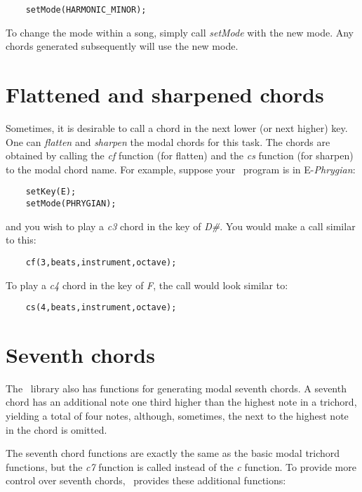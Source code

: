 \documentclass{article}
\begin{document}
\begin{verbatim}
    setMode(HARMONIC_MINOR);
\end{verbatim}

To change the mode within a song, simply call {\it setMode} with the
new mode. Any chords generated subsequently will use the new
mode.

\section*{Flattened and sharpened chords}

Sometimes, it is desirable to call a chord in the next
lower (or next higher) key. One can {\it flatten} and {\it sharpen} the
modal chords for this task. The chords are obtained by calling the
{\it cf} function
(for flatten)
and the {\it cs} function (for sharpen) to the modal chord name.
For example, suppose your
\songlib\ program is in E-{\it Phrygian}:

\begin{verbatim}
    setKey(E);
    setMode(PHRYGIAN);
\end{verbatim}

and you wish to play a {\it c3} chord in the key of {\it D\#}.
You would make a call similar to this:

\begin{verbatim}
    cf(3,beats,instrument,octave);
\end{verbatim}

To play a {\it c4} chord in the key of {\it F}, the call would
look similar to:

\begin{verbatim}
    cs(4,beats,instrument,octave);
\end{verbatim}

\section*{Seventh chords}

The \songlib\ library also has functions for generating
modal seventh chords. A seventh chord has an additional
note one third higher than the highest note
in a trichord, yielding a total of four notes, although,
sometimes, the next to the highest note in the chord is omitted.

The seventh chord functions are exactly the same
as the basic modal
trichord functions, but the {\it c7} function is called instead
of the {\it c} function.
To provide more control over seventh chords,
\songlib\ provides these additional functions:
\end{document}
